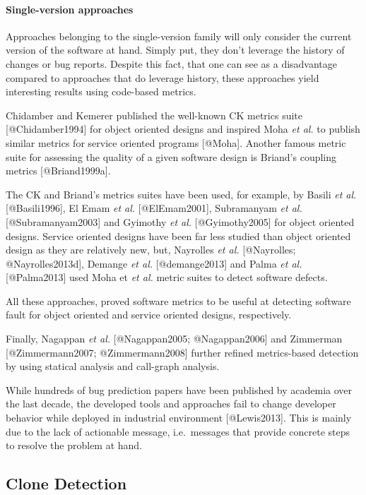 \paragraph{Single-version approaches}\label{single-version-approaches}

Approaches belonging to the single-version family will only consider the
current version of the software at hand. Simply put, they don't leverage
the history of changes or bug reports. Despite this fact, that one can
see as a disadvantage compared to approaches that do leverage history,
these approaches yield interesting results using code-based metrics.

Chidamber and Kemerer published the well-known CK metrics suite
{[}@Chidamber1994{]} for object oriented designs and inspired Moha
\emph{et al.} to publish similar metrics for service oriented programs
{[}@Moha{]}. Another famous metric suite for assessing the quality of a
given software design is Briand's coupling metrics {[}@Briand1999a{]}.

The CK and Briand's metrics suites have been used, for example, by
Basili \emph{et al.} {[}@Basili1996{]}, El Emam \emph{et al.}
{[}@ElEmam2001{]}, Subramanyam \emph{et al.} {[}@Subramanyam2003{]} and
Gyimothy \emph{et al.} {[}@Gyimothy2005{]} for object oriented designs.
Service oriented designs have been far less studied than object oriented
design as they are relatively new, but, Nayrolles \emph{et al.}
{[}@Nayrolles; @Nayrolles2013d{]}, Demange \emph{et al.}
{[}@demange2013{]} and Palma \emph{et al.} {[}@Palma2013{]} used Moha et
\emph{et al.} metric suites to detect software defects.

All these approaches, proved software metrics to be useful at detecting
software fault for object oriented and service oriented designs,
respectively.

Finally, Nagappan \emph{et al.} {[}@Nagappan2005; @Nagappan2006{]} and
Zimmerman {[}@Zimmermann2007; @Zimmermann2008{]} further refined
metrics-based detection by using statical analysis and call-graph
analysis.

While hundreds of bug prediction papers have been published by academia
over the last decade, the developed tools and approaches fail to change
developer behavior while deployed in industrial environment
{[}@Lewis2013{]}. This is mainly due to the lack of actionable message,
i.e.~messages that provide concrete steps to resolve the problem at
hand.

\subsection{Clone Detection}\label{sec:rel-clones}

